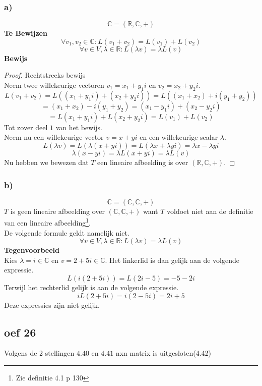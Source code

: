 \documentclass[lineaire_algebra_oplossingen.tex]{subfiles}
\begin{document}
\subsubsection*{a)}
\[
\mathbb{C} = (\mathbb{R},\mathbb{C},+)
\]
\textbf{Te Bewijzen}\\
\[
\forall v_1,v_2 \in \mathbb{C}: L(v_1+v_2) = L(v_1)+L(v_2) 
\]
\[
\forall v\in V, \lambda \in \mathbb{R}: L(\lambda v) = \lambda L(v)
\]
\textbf{Bewijs}\\
\begin{proof}
Rechtstreeks bewijs\\
Neem twee willekeurige vectoren $v_1 = x_1+y_1i$ en $v_2=x_2+y_2i$.
\[
L(v_1+v_2)=L( (x_1+y_1i) + (x_2+y_2i)) = L((x_1+x_2) + i(y_1+y_2))
\]
\[
= (x_1+x_2)-i(y_1+y_2) = (x_1-y_1i) + (x_2-y_2i)
\]
\[
= L(x_1+y_1i) + L(x_2+y_2i) = L(v_1)+L(v_2)
\]
Tot zover deel $1$ van het bewijs.\\
Neem nu een willekeurige vector $v=x+yi$ en een willekeurige scalar $\lambda$.
\[
L(\lambda v) = L(\lambda (x+yi)) = L(\lambda x + \lambda yi) = \lambda x - \lambda yi
\]
\[
\lambda (x-yi) = \lambda L(x+yi) = \lambda L(v)
\]
Nu hebben we bewezen dat $T$ een lineaire afbeelding is over $(\mathbb{R},\mathbb{C},+)$.
\end{proof}

\subsubsection*{b)}
\[
\mathbb{C} = (\mathbb{C},\mathbb{C},+)
\]
$T$ is geen lineaire afbeelding over $(\mathbb{C},\mathbb{C},+)$ want $T$ voldoet niet aan de definitie van een lineaire afbeelding\footnote{Zie definitie 4.1 p 130}. \\
De volgende formule geldt namelijk niet.
\[\forall v\in V, \lambda \in \mathbb{R}: L(\lambda v) = \lambda L(v)\]
\textbf{Tegenvoorbeeld}\\
Kies $\lambda = i \in \mathbb{C}$ en $v = 2+5i\in \mathbb{C}$.
Het linkerlid is dan gelijk aan de volgende expressie.
\[
L(i(2+5i)) = L(2i-5) = -5 -2i
\]
Terwijl het rechterlid gelijk is aan de volgende expressie.
\[
iL(2+5i) = i(2-5i) = 2i+5
\]
Deze expressies zijn niet gelijk.

\subsection*{oef 26}

Volgens de 2 stellingen $4.40$ en $4.41$ nxn matrix is uitgesloten(4.42)
\end{document}
